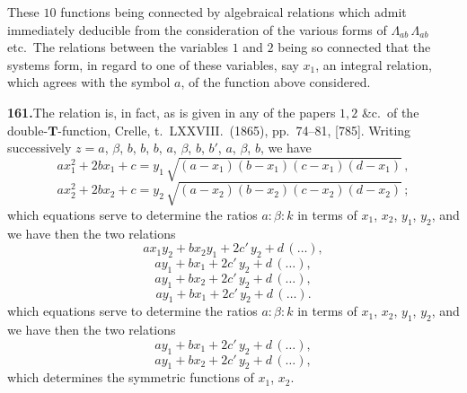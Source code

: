 \documentclass[11pt,a4paper]{article}
\begin{document}
These $10$ functions being connected by algebraical relations which admit immediately deducible from the consideration of the various forms of $\Lambda_{ab}\,\Lambda_{ab}$ etc.\ The relations between the variables $1$ and $2$ being so connected that the systems form, in regard to one of these variables, say $x_1$, an integral relation, which agrees with the symbol $a$, of the function above considered.

\medskip\noindent\textbf{161.}\quad The relation is, in fact, as is given in any of the papers $1, 2$ \&c.\ of the double-$\bm{T}$-function, Crelle, t.\ LXXVIII.\ (1865), pp.\ 74--81, [785]. Writing successively $z = a$, $\beta$, $b$, $b$, $b$, $a$, $\beta$, $b$, $b'$, $a$, $\beta$, $b$, we have
\[
ax_1^2 + 2bx_1 + c = y_1\,\sqrt{(a - x_1)(b - x_1)(c - x_1)(d - x_1)}\,,
\]
\[
ax_2^2 + 2bx_2 + c = y_2\,\sqrt{(a - x_2)(b - x_2)(c - x_2)(d - x_2)}\,;
\]
which equations serve to determine the ratios $a : \beta : k$ in terms of $x_1$, $x_2$, $y_1$, $y_2$, and we have then the two relations
\[
ax_1y_2 + bx_2y_1 + 2c'\,y_2 + d\,(\ldots),
\]
\[
ay_1 + bx_1 + 2c'\,y_2 + d\,(\ldots),
\]
\[
ay_1 + bx_2 + 2c'\,y_2 + d\,(\ldots),
\]
\[
ay_1 + bx_1 + 2c'\,y_2 + d\,(\ldots).
\]
which equations serve to determine the ratios $a : \beta : k$ in terms of $x_1$, $x_2$, $y_1$, $y_2$, and we have then the two relations
\[
ay_1 + bx_1 + 2c'\,y_2 + d\,(\ldots),
\]
\[
ay_1 + bx_2 + 2c'\,y_2 + d\,(\ldots),
\]
which determines the symmetric functions of $x_1$, $x_2$.
\end{document}
